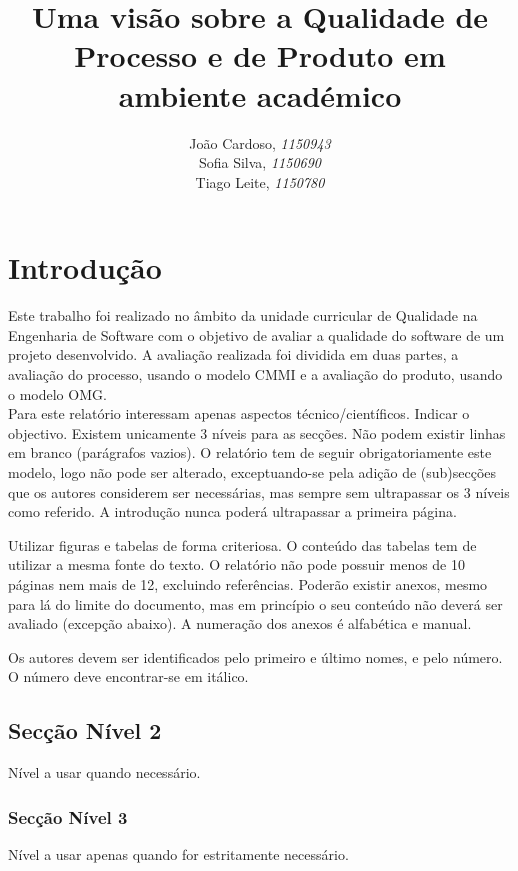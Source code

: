 \documentclass[openany,10pt,a4paper]{article}
\begin{document}

\title{\textbf{Uma visão sobre a Qualidade de Processo e de Produto em ambiente académico}}
\author{João Cardoso, \textit{1150943} \\ Sofia Silva, \textit{1150690} \\ Tiago Leite, \textit{1150780}}
\date{}

\maketitle

\section{Introdução}
Este trabalho foi realizado no âmbito da unidade curricular de Qualidade na Engenharia de Software com o objetivo de avaliar a qualidade do software de um projeto desenvolvido. A avaliação realizada foi dividida em duas partes, a avaliação do processo, usando o modelo CMMI e a avaliação do produto, usando o modelo OMG.\\

Para este relatório interessam apenas aspectos técnico/científicos. Indicar o objectivo. Existem unicamente 3 níveis para as secções. Não podem existir linhas em branco (parágrafos vazios). O relatório tem de seguir obrigatoriamente este modelo, logo não pode ser alterado, exceptuando-se pela adição de (sub)secções que os autores considerem ser necessárias, mas sempre sem ultrapassar os 3 níveis como referido. A introdução nunca poderá ultrapassar a primeira página.

Utilizar figuras e tabelas de forma criteriosa. O conteúdo das tabelas tem de utilizar a mesma fonte do texto. O relatório não pode possuir menos de 10 páginas nem mais de 12, excluindo referências. 
Poderão existir anexos, mesmo para lá do limite do documento, mas em princípio o seu conteúdo não deverá ser avaliado (excepção abaixo). A numeração dos anexos é alfabética e manual. 

Os autores devem ser identificados pelo primeiro e último nomes, e pelo número. O número deve encontrar-se em itálico.

\subsection{Secção Nível 2}
Nível a usar quando necessário.

\subsubsection{Secção Nível 3}
Nível a usar apenas quando for estritamente necessário.
\end{document}
